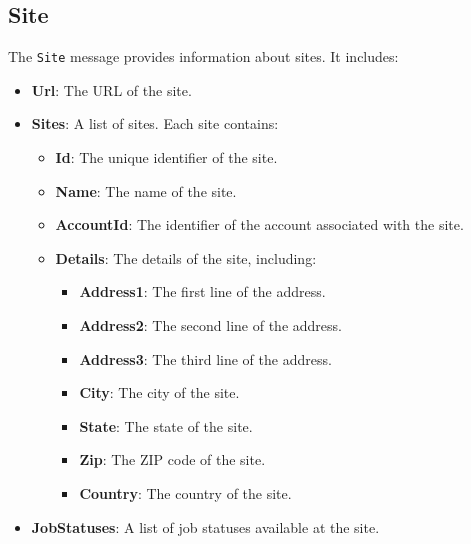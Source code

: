 \documentclass{memoir}
\begin{document}
	\subsection{Site}
	The \texttt{Site} message provides information about sites. It includes:
	\begin{itemize}
		\item \textbf{Url}: The URL of the site.
		\item \textbf{Sites}: A list of sites. Each site contains:
		\begin{itemize}
			\item \textbf{Id}: The unique identifier of the site.
			\item \textbf{Name}: The name of the site.
			\item \textbf{AccountId}: The identifier of the account associated with the site.
			\item \textbf{Details}: The details of the site, including:
			\begin{itemize}
				\item \textbf{Address1}: The first line of the address.
				\item \textbf{Address2}: The second line of the address.
				\item \textbf{Address3}: The third line of the address.
				\item \textbf{City}: The city of the site.
				\item \textbf{State}: The state of the site.
				\item \textbf{Zip}: The ZIP code of the site.
				\item \textbf{Country}: The country of the site.
			\end{itemize}
		\end{itemize}
		\item \textbf{JobStatuses}: A list of job statuses available at the site.
	\end{itemize}
	
\end{document}
